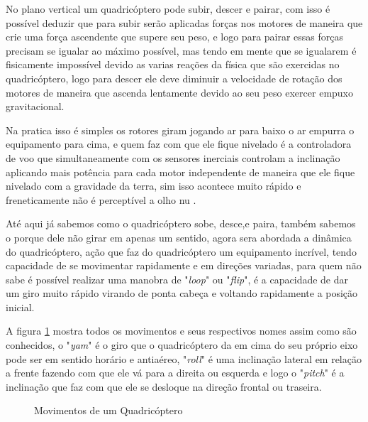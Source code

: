 No plano vertical um quadricóptero pode subir, descer e pairar, com isso é possível deduzir que para subir serão aplicadas forças nos motores de maneira que crie uma força ascendente que supere seu peso, e logo para pairar essas forças precisam se igualar ao máximo possível, mas tendo em mente que se igualarem é fisicamente impossível devido as varias reações da física que são exercidas no quadricóptero, logo para descer ele deve diminuir a velocidade de rotação dos motores de maneira que ascenda lentamente devido ao seu peso exercer empuxo gravitacional. 

Na pratica isso é simples os rotores giram jogando ar para baixo o ar empurra o equipamento para cima, e quem faz com que ele fique nivelado é a controladora de voo que simultaneamente com os sensores inerciais controlam a inclinação aplicando mais potência para cada motor independente de maneira que ele fique nivelado com a gravidade da terra, sim isso acontece muito rápido e freneticamente não é perceptível a olho nu \cite{forcecontrol}. 

Até aqui já sabemos como o quadricóptero sobe, desce,e paira, também sabemos o porque dele não girar em apenas um sentido, agora sera abordada a dinâmica do quadricóptero, ação que faz do quadricóptero um equipamento incrível, tendo capacidade de se movimentar rapidamente e em direções variadas, para quem não sabe é possível realizar uma manobra de "\textit{loop}" ou "\textit{flip}", é a capacidade de dar um giro muito rápido virando de ponta cabeça e voltando rapidamente a posição inicial. 

A figura \ref{fig:yamrollpitch} mostra todos os movimentos e seus respectivos nomes assim como são conhecidos, o "\textit{yam}" é o giro que o quadricóptero da em cima do seu próprio eixo pode ser em sentido horário e antiaéreo, "\textit{roll}" é uma inclinação lateral em relação a frente fazendo com que ele vá para a direita ou esquerda e logo o "\textit{pitch}" é a inclinação que faz com que ele se desloque na direção frontal ou traseira. 

\begin{figure}[H]
	\centering
	\caption{Movimentos de um Quadricóptero}
	\fontsize{9pt}{12pt}\selectfont
	\def\svgwidth{15cm}
	
	\label{fig:yamrollpitch}
\end{figure}

